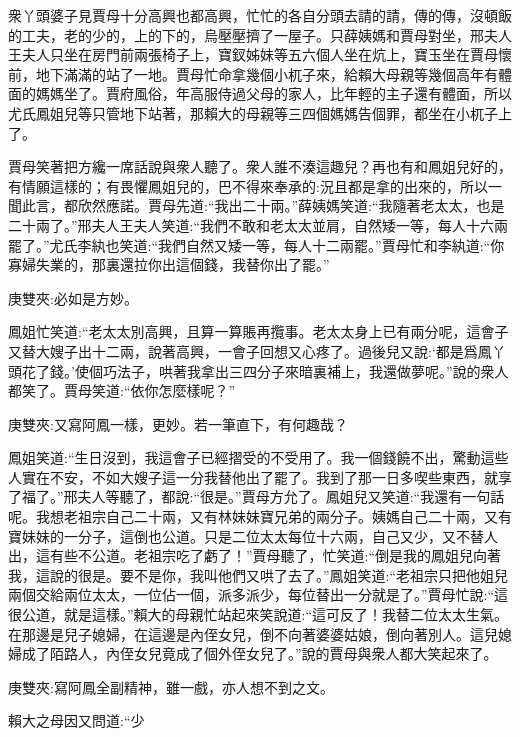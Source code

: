 \begin{parag}
    衆丫頭婆子見賈母十分高興也都高興，忙忙的各自分頭去請的請，傳的傳，沒頓飯的工夫，老的少的，上的下的，烏壓壓擠了一屋子。只薛姨媽和賈母對坐，邢夫人王夫人只坐在房門前兩張椅子上，寶釵姊妹等五六個人坐在炕上，寶玉坐在賈母懷前，地下滿滿的站了一地。賈母忙命拿幾個小杌子來，給賴大母親等幾個高年有體面的媽媽坐了。賈府風俗，年高服侍過父母的家人，比年輕的主子還有體面，所以尤氏鳳姐兒等只管地下站著，那賴大的母親等三四個媽媽告個罪，都坐在小杌子上了。
\end{parag}


\begin{parag}
    賈母笑著把方纔一席話說與衆人聽了。衆人誰不湊這趣兒？再也有和鳳姐兒好的，有情願這樣的；有畏懼鳳姐兒的，巴不得來奉承的:況且都是拿的出來的，所以一聞此言，都欣然應諾。賈母先道:“我出二十兩。”薛姨媽笑道:“我隨著老太太，也是二十兩了。”邢夫人王夫人笑道:“我們不敢和老太太並肩，自然矮一等，每人十六兩罷了。”尤氏李紈也笑道:“我們自然又矮一等，每人十二兩罷。”賈母忙和李紈道:“你寡婦失業的，那裏還拉你出這個錢，我替你出了罷。”\begin{note}庚雙夾:必如是方妙。\end{note}鳳姐忙笑道:“老太太別高興，且算一算賬再攬事。老太太身上已有兩分呢，這會子又替大嫂子出十二兩，說著高興，一會子回想又心疼了。過後兒又說:‘都是爲鳳丫頭花了錢。’使個巧法子，哄著我拿出三四分子來暗裏補上，我還做夢呢。”說的衆人都笑了。賈母笑道:“依你怎麼樣呢？”\begin{note}庚雙夾:又寫阿鳳一樣，更妙。若一筆直下，有何趣哉？\end{note}鳳姐笑道:“生日沒到，我這會子已經摺受的不受用了。我一個錢饒不出，驚動這些人實在不安，不如大嫂子這一分我替他出了罷了。我到了那一日多喫些東西，就享了福了。”邢夫人等聽了，都說:“很是。”賈母方允了。鳳姐兒又笑道:“我還有一句話呢。我想老祖宗自己二十兩，又有林妹妹寶兄弟的兩分子。姨媽自己二十兩，又有寶妹妹的一分子，這倒也公道。只是二位太太每位十六兩，自己又少，又不替人出，這有些不公道。老祖宗吃了虧了！”賈母聽了，忙笑道:“倒是我的鳳姐兒向著我，這說的很是。要不是你，我叫他們又哄了去了。”鳳姐笑道:“老祖宗只把他姐兒兩個交給兩位太太，一位佔一個，派多派少，每位替出一分就是了。”賈母忙說:“這很公道，就是這樣。”賴大的母親忙站起來笑說道:“這可反了！我替二位太太生氣。在那邊是兒子媳婦，在這邊是內侄女兒，倒不向著婆婆姑娘，倒向著別人。這兒媳婦成了陌路人，內侄女兒竟成了個外侄女兒了。”說的賈母與衆人都大笑起來了。\begin{note}庚雙夾:寫阿鳳全副精神，雖一戲，亦人想不到之文。\end{note}賴大之母因又問道:“少
\end{parag}
